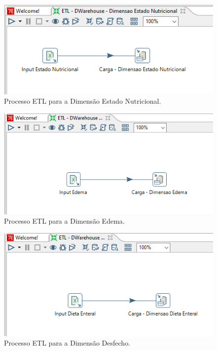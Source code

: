 \begin{figure}[htb]
	\caption{\label{fig_etldimensaoestado}Processo ETL para a Dimensão Estado Nutricional.}
	\begin{center}
	    \includegraphics[scale=0.8]{Imagens/figura - etl dw estadonutricional.png}
	\end{center}
\end{figure}
                    \clearpage
\begin{figure}[htb]
	\caption{\label{fig_etldimensaoedema}Processo ETL para a Dimensão Edema.}
	\begin{center}
	    \includegraphics[scale=0.7]{Imagens/figura - etl dw edema.png}
	\end{center}
\end{figure}

\begin{figure}[htb]
	\caption{\label{fig_etldimensaodesfecho}Processo ETL para a Dimensão Desfecho.}
	\begin{center}
	    \includegraphics[scale=0.7]{Imagens/figura - etl dw dietaenteral.png}
	\end{center}
\end{figure}

